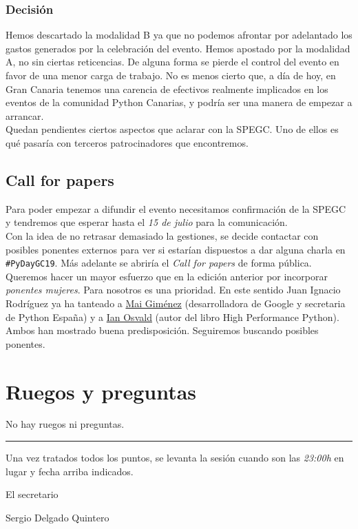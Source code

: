 \documentclass[a4paper, 12pt]{article}
\begin{document}
\subsubsection*{Decisión}

Hemos descartado la modalidad B ya que no podemos afrontar por adelantado los gastos generados por la celebración del evento. Hemos apostado por la modalidad A, no sin ciertas reticencias. De alguna forma se pierde el control del evento en favor de una menor carga de trabajo. No es menos cierto que, a día de hoy, en Gran Canaria tenemos una carencia de efectivos realmente implicados en los eventos de la comunidad Python Canarias, y podría ser una manera de empezar a arrancar.\\

Quedan pendientes ciertos aspectos que aclarar con la SPEGC. Uno de ellos es qué pasaría con terceros patrocinadores que encontremos.

\subsection*{Call for papers}

Para poder empezar a difundir el evento necesitamos confirmación de la SPEGC y tendremos que esperar hasta el \textit{15 de julio} para la comunicación.\\

Con la idea de no retrasar demasiado la gestiones, se decide contactar con posibles ponentes externos para ver si estarían dispuestos a dar alguna charla en \texttt{\#PyDayGC19}. Más adelante se abriría el \textit{Call for papers} de forma pública. Queremos hacer un mayor esfuerzo que en la edición anterior por incorporar \textit{ponentes mujeres}. Para nosotros es una prioridad. En este sentido Juan Ignacio Rodríguez ya ha tanteado a \href{https://twitter.com/maidotgimenez}{Mai Giménez} (desarrolladora de Google y secretaria de Python España) y a \href{https://twitter.com/ianozsvald}{Ian Osvald} (autor del libro High Performance Python). Ambos han mostrado buena predisposición. Seguiremos buscando posibles ponentes.

\section{Ruegos y preguntas}

No hay ruegos ni preguntas.


\vspace{1cm}
\hrule
\vspace{3mm}

Una vez tratados todos los puntos, se levanta la sesión cuando son las \textit{23:00h} en lugar y fecha arriba indicados.

\begin{flushright}
El secretario

Sergio Delgado Quintero
\end{flushright}
\end{document}
